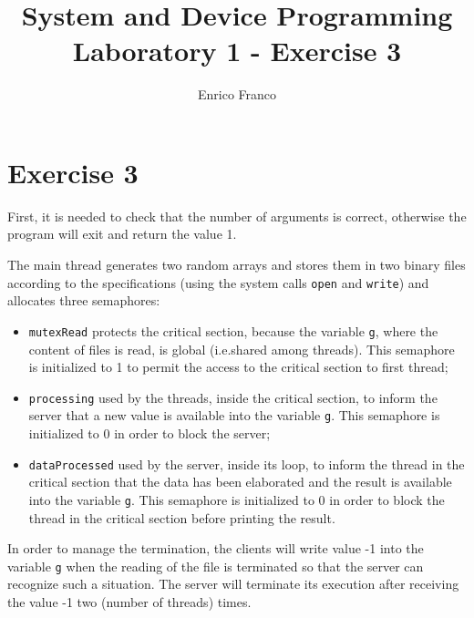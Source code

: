 \documentclass{report}
\author{Enrico Franco}
\title{System and Device Programming \\
	Laboratory 1 - Exercise 3}
\begin{document}
\section*{Exercise 3}
First, it is needed to check that the number of arguments is correct, otherwise the program will exit and return the value 1.

The main thread generates two random arrays and stores them in two binary files according to the specifications (using the system calls \texttt{open} and \texttt{write}) and allocates three semaphores:
\begin{itemize}
\item \texttt{mutexRead} protects the critical section, because the variable \texttt{g}, where the content of files is read, is global (i.e.\@ shared among threads). This semaphore is initialized to 1 to permit the access to the critical section to first thread;
\item \texttt{processing} used by the threads, inside the critical section, to inform the server that a new value is available into the variable \texttt{g}. This semaphore is initialized to 0 in order to block the server;
\item \texttt{dataProcessed} used by the server, inside its loop, to inform the thread in the critical section that the data has been elaborated and the result is available into the variable \texttt{g}. This semaphore is initialized to 0 in order to block the thread in the critical section before printing the result.
\end{itemize}

In order to manage the termination, the clients will write value -1 into the variable \texttt{g} when the reading of the file is terminated so that the server can recognize such a situation. The server will terminate its execution after receiving the value -1 two (number of threads) times.
\end{document}
